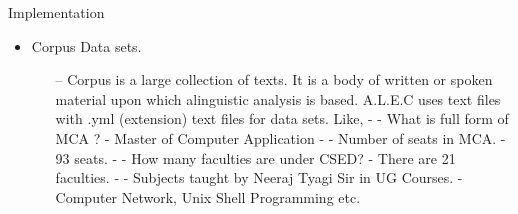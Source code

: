 \documentclass{beamer}
\begin{document}
\begin{frame}{Implementation}
  \begin{itemize}
      \item \Large{Corpus Data sets.}
      \linebreak
        \begin{itemize}
            \item[--]  Corpus is a large collection of texts. It is a body of written or spoken material upon which alinguistic analysis is based. A.L.E.C uses text files with .yml (extension) text files for data sets. Like,
            \linebreak
            \linebreak
             - - What is full form of MCA ?
            \linebreak
             - Master of Computer Application
             \linebreak
             - - Number of seats in MCA.
             \linebreak
             - 93 seats.
             \linebreak
             - - How many faculties are under CSED?
             \linebreak
             - There are 21 faculties.
             \linebreak
             - - Subjects taught by Neeraj Tyagi Sir in UG Courses.
             \linebreak
  - Computer Network, Unix Shell Programming etc.
        \end{itemize}
  \end{itemize}
    
\end{frame}
\end{document}
